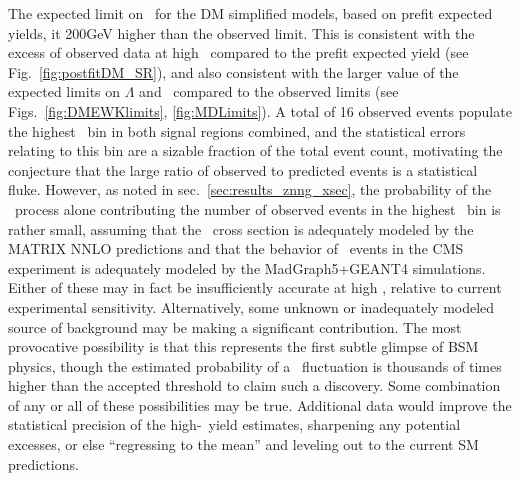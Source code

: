 The expected limit on \mmed\ for the DM simplified models, based on prefit expected yields,
it 200\unit{GeV} higher than the observed limit. This is consistent with the excess of observed data at high \ETgamma\ compared to the prefit
expected yield (see Fig.~\ref{fig:postfitDM_SR}), and also consistent with the larger value of the expected limits on $\Lambda$ and \mD\ compared
to the observed limits (see Figs.~\ref{fig:DMEWKlimits}, \ref{fig:MDLimits}). A total of 16 observed events populate the highest \ETgamma\ bin
in both signal regions combined, and the statistical errors relating to this bin are a sizable fraction of the total event count, motivating the
conjecture that the large ratio of observed to predicted events is a statistical fluke. However, as noted in sec.~\ref{sec:results_znng_xsec}, the probability
of the \zinvg\ process alone contributing the number of observed events in the highest \ETgamma\ bin is rather small, assuming that the \zinvg\ cross
section is adequately modeled by the MATRIX NNLO predictions and that the behavior of \zinvg\ events in the CMS experiment is adequately modeled
by the MadGraph5+GEANT4 simulations. Either of these may in fact be insufficiently accurate at high \pTgamma, relative to current experimental
sensitivity. Alternatively, some unknown or inadequately modeled source of background may be making a significant contribution. The most
provocative possibility is that this represents the first subtle glimpse of BSM physics, though the estimated probability of a \zinvg\ fluctuation
is thousands of times higher than the accepted threshold to claim such a discovery. Some combination of any or all of these possibilities may be true.
Additional data would improve the statistical precision of the high-\ETgamma\ yield estimates, sharpening any potential excesses, or else
``regressing to the mean'' and leveling out to the current SM predictions.


